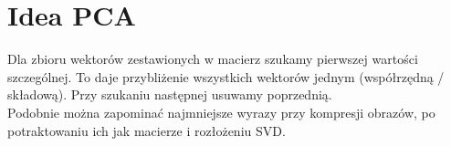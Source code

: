 \section{Idea PCA}
Dla zbioru wektorów zestawionych w macierz szukamy pierwszej wartości szczególnej. To daje przybliżenie wszystkich wektorów jednym (współrzędną / składową). Przy szukaniu następnej usuwamy poprzednią. \\
Podobnie można zapominać najmniejsze wyrazy przy kompresji obrazów, po potraktowaniu ich jak macierze i rozłożeniu SVD.